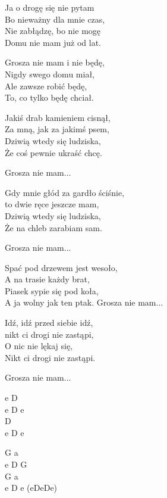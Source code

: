 \begin{textn}
    Ja o drogę się nie pytam\\
    Bo nieważny dla mnie czas,\\
    Nie zabłądzę, bo nie mogę\\
    Domu nie mam już od lat.

    \vin Grosza nie mam i nie będę,\\
    \vin Nigdy swego domu miał,\\
    \vin Ale zawsze robić będę,\\
    \vin To, co tylko będę chciał.

    Jakiś drab kamieniem cisnął,\\
    Za mną, jak za jakimś psem,\\
    Dziwią wtedy się ludziska,\\
    Że coś pewnie ukraść chcę.

    \vin Grosza nie mam...

    Gdy mnie głód za gardło ściśnie,\\
    to dwie ręce jeszcze mam,\\
    Dziwią wtedy się ludziska,\\
    Że na chleb zarabiam sam.

    \vin Grosza nie mam...

    Spać pod drzewem jest wesoło,\\
    A na trasie każdy brat,\\
    Piasek sypie się pod koła,\\
    A ja wolny jak ten ptak.
    \vin Grosza nie mam...


    Idź, idź przed siebie idź,\\
    nikt ci drogi nie zastąpi,\\
    O nic nie lękaj się,\\
    Nikt ci drogi nie zastąpi.
    
    \vin Grosza nie mam...
\end{textn}
\begin{chordw}
    e D\\
    e D e\\
    D\\
    e D e

    G a\\
    e D G\\
    G a\\
    e D e (eDeDe)
\end{chordw}